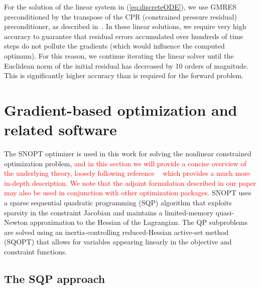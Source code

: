 \documentclass[twocolumn,numbook]{svjour3}          %
\newcommand{\red}[1]{\textcolor{red}{#1}}
\def\u{{\vec u}}
\def\c{{\vec c}}
\def\x{{\vec x}}
\def\s{{\vec s}}
\def\g{{\vec{G}}}
\def\blambda{{\pmb{\lambda}}}%
\def\nthinsp{\mskip -2   mu}
\def\blambdahat{\skew1\widehat \blambda}
\def\blambdastar{\blambda\superstar}
\def\shat{\widehat \s}
\def\sstar{\s\superstar}
\def\superstar{^{\raise 0.5pt\hbox{$\nthinsp *$}}}
\def\xstar{\x\superstar}
\def\uhat{\skew{2.8}\widehat \u}
\def\ustar{\u\superstar}
\def\GQPk{GQP$_k$}
\def\SNOPT {{\small SNOPT}}
\def\SQOPT {{\small SQOPT}}
\begin{document}
For the solution of the linear system in (\ref{eq:discreteODE}), we use
GMRES preconditioned by the transpose of the CPR (constrained
pressure residual) preconditioner, as described in~\cite{CPRA}. In these
linear solutions, we require very high accuracy to guarantee that residual
errors accumulated over hundreds of time steps do not pollute the gradients
(which would influence the computed optimum). For this reason, we continue
iterating the linear solver until the Euclidean norm of the initial residual has
decreased by 10 orders of magnitude. This is significantly higher accuracy than
is required for the forward problem.




\section{Gradient-based optimization and related software}
\label{sec:SQPSNOPT}

The \SNOPT{} optimizer is used in this work for solving the nonlinear constrained
optimization problem, \red{and in this section we will provide a concise overview of the underlying theory, loosely following reference ~\cite{SNOPT} which provides a much more in-depth description. We note that the adjoint formulation described in our paper may also be used in conjunction with other optimization packages.} \SNOPT{} uses a sparse sequential quadratic
programming (SQP) algorithm that exploits sparsity in
the constraint Jacobian and maintains a limited-memory quasi-Newton
approximation to the Hessian of the Lagrangian. The QP
subproblems are solved using an inertia-controlling reduced-Hessian
active-set method (\SQOPT) that allows for variables appearing
linearly in the objective and constraint functions. 
 
\subsection{The SQP approach}

%
\end{document}
